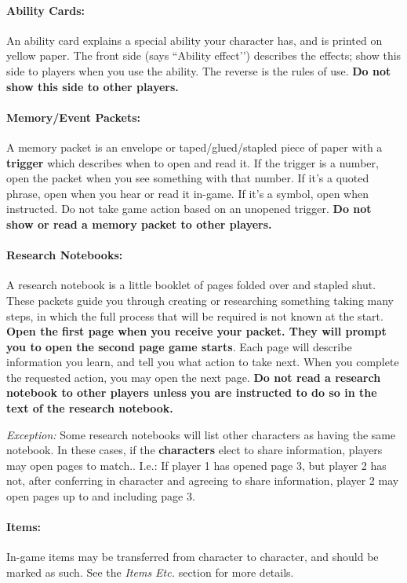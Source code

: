 \documentclass[sheet]{GL2020}
\begin{document}
\paragraph{Ability Cards:} An ability card explains a special ability your character has, and is printed on yellow paper. The front side (says ``Ability effect'’) describes the effects; show this side to players when you use the ability.  The reverse is the rules of use. \textbf{Do not show  this side to other players.}

\paragraph{Memory/Event Packets:} A memory packet is an envelope or taped/glued/stapled piece of paper with a {\bf trigger} which describes when to open and read it. If the trigger is a number, open the packet when you see something with that number. If it's a quoted phrase, open when you hear or read it in-game.  If it's a symbol, open when instructed. Do not take game action based on an unopened trigger. \textbf{Do not show or read a memory packet to other players.}

\paragraph{Research Notebooks:} A research notebook is a little booklet of pages folded over and stapled shut. These packets guide you through creating or researching something taking many steps, in which the full process that will be required is not known at the start. \textbf{Open the first page when you receive your packet. They will prompt you to open the second page game starts}. Each page will describe information you learn, and tell you what action to take next. When you complete the requested action, you may open the next page. \textbf{Do not read a research notebook to other players unless you are instructed to do so in the text of the research notebook.}

\emph{Exception:} Some research notebooks will list other characters as having the same notebook. In these cases, if the \textbf{characters} elect to share information, players may open pages to match.. I.e.: If player 1 has opened page 3, but player 2 has not, after conferring in character and agreeing to share information, player 2 may open pages up to and including page 3.

\paragraph{Items:} In-game items may be transferred from character to character, and should be marked as such.  See the \emph{Items Etc.} section for more details.
\end{document}
